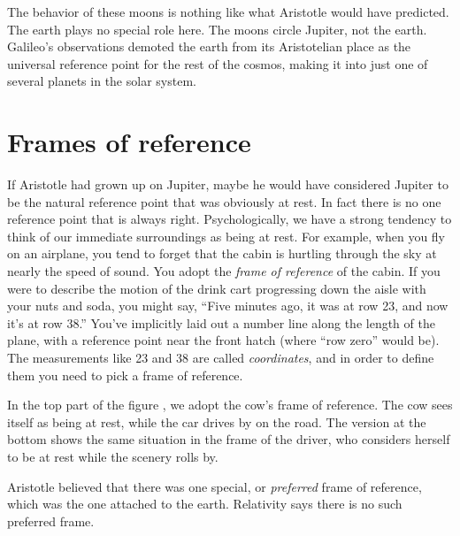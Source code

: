The behavior of these moons is nothing like what Aristotle would have predicted. The earth
plays no special role here. The moons circle Jupiter, not the earth. Galileo's observations demoted
the earth from its Aristotelian place as the universal reference point for the rest of the cosmos,
making it into just one of several planets in the solar system.

\begin{figure}\label{fig:galileo-jovian-moons-sketch}
\end{figure}

\vfill\pagebreak

\section{Frames of reference}

If Aristotle had grown up on Jupiter, maybe he would have considered Jupiter to be the natural reference
point that was obviously at rest. In fact there is no one reference point that is always right. Psychologically,
we have a strong tendency to think of our immediate surroundings as being at rest. For example, when you fly
on an airplane, you tend to forget that the cabin is hurtling through the sky at nearly the speed of sound.
You adopt the \emph{frame of reference} of the cabin.
If you were to describe the motion of the drink cart progressing down the aisle with your nuts and soda,
you might say, ``Five minutes ago, it was at row 23, and now it's at row 38.'' You've implicitly laid out
a number line along the length of the plane, with a reference point near the front hatch (where ``row zero'' would be).
The measurements like 23 and 38 are called \emph{coordinates}, and in order to define them you need to pick
a frame of reference.

\begin{figure}\label{fig:cow-and-car}
\end{figure}

In the top part of the figure , we adopt the cow's frame of reference. The cow sees itself as being at rest,
while the car drives by on the road. The version at the bottom shows the same situation in
the frame of the driver,
who considers herself to be at rest while the scenery rolls by.

Aristotle believed that there was one special, or \emph{preferred} frame of reference, which was
the one attached to the earth. Relativity says there is no such
preferred frame.

